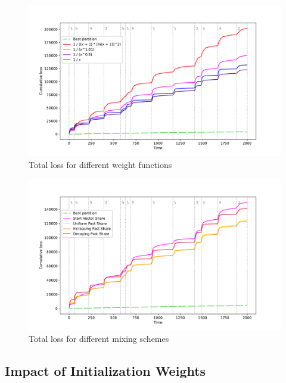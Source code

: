 \documentclass[12pt, twoside]{article}
\begin{document}
\begin{figure}[htb]
\centering %
\includegraphics[width=1\linewidth]{diff_wf}
\caption{Total loss for different weight functions}
\end{figure}


\begin{figure}[htb]
\centering %
\includegraphics[width=1\linewidth]{diff_mt}
\caption{Total loss for different mixing schemes}
\medskip
\end{figure}

\subsection{Impact of Initialization Weights}
\end{document}
